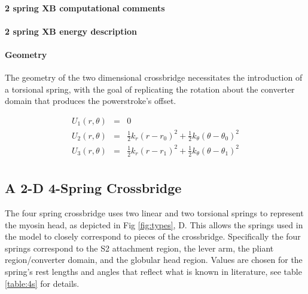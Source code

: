 \documentclass[]{article}
\begin{document}
\paragraph*{2 spring XB computational comments} %
\label{par:2_spring_xb_computational_comments}


\paragraph*{2 spring XB energy description} %
\label{par:2_spring_xb_energy_description}


\paragraph*{Geometry}

The geometry of the two dimensional crossbridge necessitates the introduction of a torsional spring, with the goal of replicating the rotation about the converter domain that produces the powerstroke's offset.


\begin{eqnarray}
\label{2sEnergy}
	U_1(r,\theta) & = & 0 \nonumber \\
    U_2(r,\theta) & = & \frac{1}{2}k_r (r - r_0)^2 + 
                        \frac{1}{2}k_\theta (\theta - \theta_0)^2 \nonumber \\
    U_3(r,\theta) & = & \frac{1}{2}k_r (r - r_1)^2 + 
                        \frac{1}{2}k_\theta (\theta - \theta_1)^2 \\
\end{eqnarray}


\subsection{A 2-D 4-Spring Crossbridge} %
\label{sub:a_2_d_4_spring_crossbridge}

The four spring crossbridge uses two linear and two torsional springs to represent the myosin head, as depicted in Fig \ref{fig:types}, D. 
This allows the springs used in the model to closely correspond to pieces of the crossbridge. 
Specifically the four springs correspond to the S2 attachment region, the lever arm, the pliant region/converter domain, and the globular head region.
Values are chosen for the spring's rest lengths and angles that reflect what is known in literature, see table \ref{table:4s} for details.
\end{document}
